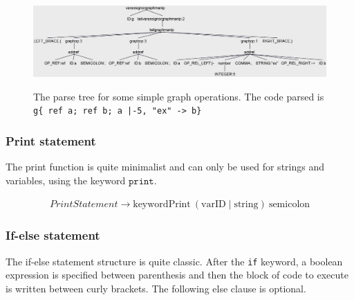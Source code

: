 \begin{figure}[H]
    \centering
    \includegraphics[height = 3.5cm]{figures/parse_trees/parseTree_graphManip}
    \caption{The parse tree for some simple graph operations. The code parsed is \texttt{g\{
        ref a;
        ref b;
        a |-5, "ex" -> b\} }}
    \label{fig:parseTree_graphManip}
\end{figure} %

\subsubsection*{Print statement}

The print function is quite minimalist and can only be used for strings and variables, using the keyword $\texttt{print}$.

\begin{align*}
    \mathit{PrintStatement} \rightarrow \text{keywordPrint} \: (\text{varID} \mid \text{string}) \: \text{semicolon}
\end{align*}

\subsubsection*{If-else statement}

The if-else statement structure is quite classic.
After the \texttt{if} keyword, a boolean expression is specified between parenthesis and then the block of code to execute is written between curly brackets.
The following else clause is optional.


